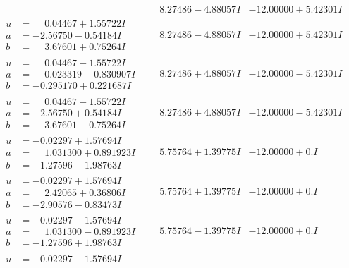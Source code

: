 \documentclass[1p]{elsarticle_modified}
\theoremstyle{definition}
\begin{document}
$$\begin{array}{c|c|c}
 & \phantom{-}8.27486 - 4.88057 I & -12.00000 + 5.42301 I \\ \hline\begin{aligned}
u &= \phantom{-}0.04467 + 1.55722 I \\
a &= -2.56750 - 0.54184 I \\
b &= \phantom{-}3.67601 + 0.75264 I\end{aligned}
 & \phantom{-}8.27486 - 4.88057 I & -12.00000 + 5.42301 I \\ \hline\begin{aligned}
u &= \phantom{-}0.04467 - 1.55722 I \\
a &= \phantom{-}0.023319 - 0.830907 I \\
b &= -0.295170 + 0.221687 I\end{aligned}
 & \phantom{-}8.27486 + 4.88057 I & -12.00000 - 5.42301 I \\ \hline\begin{aligned}
u &= \phantom{-}0.04467 - 1.55722 I \\
a &= -2.56750 + 0.54184 I \\
b &= \phantom{-}3.67601 - 0.75264 I\end{aligned}
 & \phantom{-}8.27486 + 4.88057 I & -12.00000 - 5.42301 I \\ \hline\begin{aligned}
u &= -0.02297 + 1.57694 I \\
a &= \phantom{-}1.031300 + 0.891923 I \\
b &= -1.27596 - 1.98763 I\end{aligned}
 & \phantom{-}5.75764 + 1.39775 I & -12.00000 + 0. I\phantom{ +0.000000I} \\ \hline\begin{aligned}
u &= -0.02297 + 1.57694 I \\
a &= \phantom{-}2.42065 + 0.36806 I \\
b &= -2.90576 - 0.83473 I\end{aligned}
 & \phantom{-}5.75764 + 1.39775 I & -12.00000 + 0. I\phantom{ +0.000000I} \\ \hline\begin{aligned}
u &= -0.02297 - 1.57694 I \\
a &= \phantom{-}1.031300 - 0.891923 I \\
b &= -1.27596 + 1.98763 I\end{aligned}
 & \phantom{-}5.75764 - 1.39775 I & -12.00000 + 0. I\phantom{ +0.000000I} \\ \hline\begin{aligned}
u &= -0.02297 - 1.57694 I \\

\end{aligned}
\end{array}$$
\end{document}
